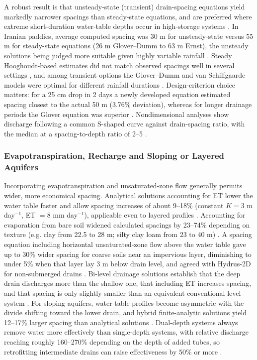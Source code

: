 \documentclass[11pt]{article}
\begin{document}
A robust result is that unsteady-state (transient) drain-spacing equations yield markedly narrower spacings than steady-state equations, and are preferred where extreme short-duration water-table depths occur in high-storage systems \parencite{OOSTERBAAN1988}. In Iranian paddies, average computed spacing was 30 m for unsteady-state versus 55 m for steady-state equations (26 m Glover--Dumm to 63 m Ernst), the unsteady solutions being judged more suitable given highly variable rainfall \parencite{DarziNaftchally2014}. Steady Hooghoudt-based estimates did not match observed spacings well in several settings \parencite{Moshayedi2020}, and among transient options the Glover--Dumm and van Schilfgaarde models were optimal for different rainfall durations \parencite{Moshayedi2020}. Design-criterion choice matters: for a 25 cm drop in 2 days a newly developed equation estimated spacing closest to the actual 50 m (3.76\% deviation), whereas for longer drainage periods the Glover equation was superior \parencite{Pali2014}. Nondimensional analyses show discharge following a common S-shaped curve against drain-spacing ratio, with the median at a spacing-to-depth ratio of 2--5 \parencite{Nédélec2010}.

\subsubsection{Evapotranspiration, Recharge and Sloping or Layered Aquifers}

Incorporating evapotranspiration and unsaturated-zone flow generally permits wider, more economical spacing. Analytical solutions accounting for ET lower the water table faster and allow spacing increases of about 9--18\% (constant $K=3$ m day$^{-1}$, ET $=8$ mm day$^{-1}$), applicable even to layered profiles \parencite{NIKAM1992,Singh2010,Upadhyaya2000}. Accounting for evaporation from bare soil widened calculated spacings by 23--74\% depending on texture (e.g. clay from 22.5 to 28 m; silty clay loam from 23 to 40 m) \parencite{AbdelFattah2005}. A spacing equation including horizontal unsaturated-zone flow above the water table gave up to 30\% wider spacing for coarse soils near an impervious layer, diminishing to under 5\% when that layer lay 3 m below drain level, and agreed with Hydrus-2D for non-submerged drains \parencite{Yousfi2014}. Bi-level drainage solutions establish that the deep drain discharges more than the shallow one, that including ET increases spacing, and that spacing is only slightly smaller than an equivalent conventional level system \parencite{Verma1998,Upadhyaya2000,Kankarej2023}. For sloping aquifers, water-table profiles become asymmetric with the divide shifting toward the lower drain, and hybrid finite-analytic solutions yield 12--17\% larger spacing than analytical solutions \parencite{Singh2010,Upadhyaya2013,Hartani2001}. Dual-depth systems always remove water more effectively than single-depth systems, with relative discharge reaching roughly 160--270\% depending on the depth of added tubes, so retrofitting intermediate drains can raise effectiveness by 50\% or more \parencite{Kirkham1997}.
\end{document}

